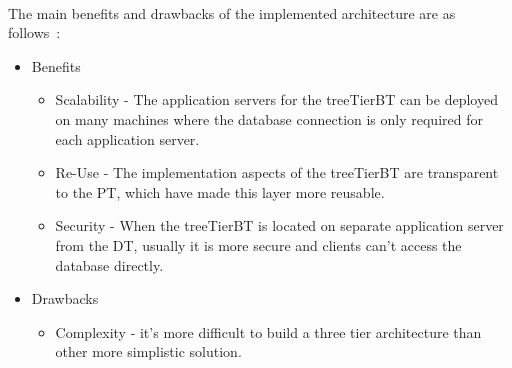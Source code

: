 \\
The main benefits and drawbacks of the implemented architecture are as follows~\cite{threeTierArchitecture}:
\begin{itemize}
\item Benefits
	\begin{itemize}
		\item Scalability - The application servers for the \gls{treeTierBT} can be deployed on many machines where  the database connection is only required for each application server.
		\item Re-Use - The implementation aspects of the \gls{treeTierBT} are transparent to the PT, which have made 
  this layer more reusable.
		\item Security - When the \gls{treeTierBT} is located on separate application server from the DT, usually it is more secure and clients can't access the database directly.
	\end{itemize}
\item Drawbacks
	\begin{itemize}
		\item Complexity - it's more difficult to build a three tier architecture than other more simplistic solution.
	\end{itemize}
\end{itemize}
	
